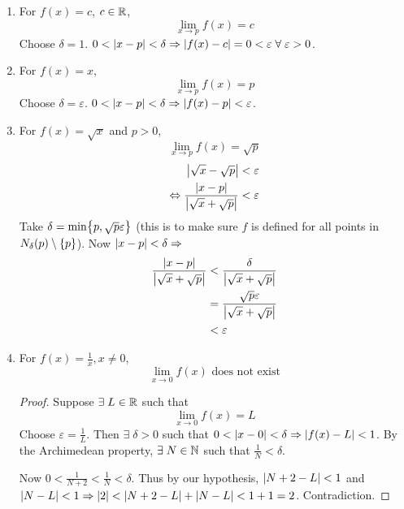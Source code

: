 \documentclass[12pt]{article}
\begin{document}
\begin{example}
    \begin{enumerate}[label=(\alph*)]
        \item For $f(x) = c$, $c \in \mathbb{R}$, \[
            \lim_{x \to p} f(x) = c
        \] Choose $\delta = 1$. $0 < \abs{ x - p } < \delta \implies \abs{ f(x) - c } = 0 < \varepsilon \;\forall\; \varepsilon > 0$.

        \item For $f(x) = x$, \[
            \lim_{x \to p} f(x) = p
        \] Choose $\delta = \varepsilon$. $ 0 < \abs{ x - p } < \delta \implies \abs{ f(x) - p} < \varepsilon$.

        \item For $f(x) = \sqrt{x}$ and $p > 0$, \[
            \lim_{x \to p} f(x) = \sqrt{p}
        \]
        \begin{align*}
            \abs{ \sqrt{x} - \sqrt{p} } &< \varepsilon \\
            \iff \frac{\abs{ x - p }}{\abs{ \sqrt{x} + \sqrt{p} }} &< \varepsilon \\
        \end{align*}
        Take $\delta = \min \set{p, \sqrt{p} \varepsilon}$ (this is to make sure $f$ is defined for all points in $N_{\delta}(p) \setminus \set{p}$). Now $\abs{ x - p} < \delta \implies$
        \begin{align*}
            \frac{\abs{ x - p }}{\abs{ \sqrt{x} + \sqrt{p} }} &< \frac{\delta}{\abs{ \sqrt{x} + \sqrt{p} }} \\
            &= \frac{\sqrt{p} \varepsilon}{\abs{ \sqrt{x} + \sqrt{p} }} \\
            &< \varepsilon \qedhere
        \end{align*}

        \item For $f(x) = \frac{1}{x}, x \neq 0$, \[
            \lim_{x \to 0} f(x) \text{ does not exist}
        \]
        \begin{proof}
            Suppose $\exists\; L \in \mathbb{R}$ such that \[
                \lim_{x \to 0} f(x) = L
            \] Choose $\varepsilon = \frac{1}{L}$. Then $\exists\; \delta > 0$ such that $ 0 < \abs{ x - 0 } < \delta \implies \abs{ f(x) - L } < 1$. By the Archimedean property, $\exists\; N \in \mathbb{N}$ such that $\frac{1}{N} < \delta$.

            Now $0 < \frac{1}{N+2} < \frac{1}{N} < \delta$. Thus by our hypothesis, $\abs{ N + 2 - L } < 1$ and $\abs{ N - L } < 1 \implies \abs{ 2 } < \abs{ N + 2 - L } + \abs{ N - L } < 1 + 1 = 2$. Contradiction.
        \end{proof}
    \end{enumerate}
\end{example}
\end{document}
